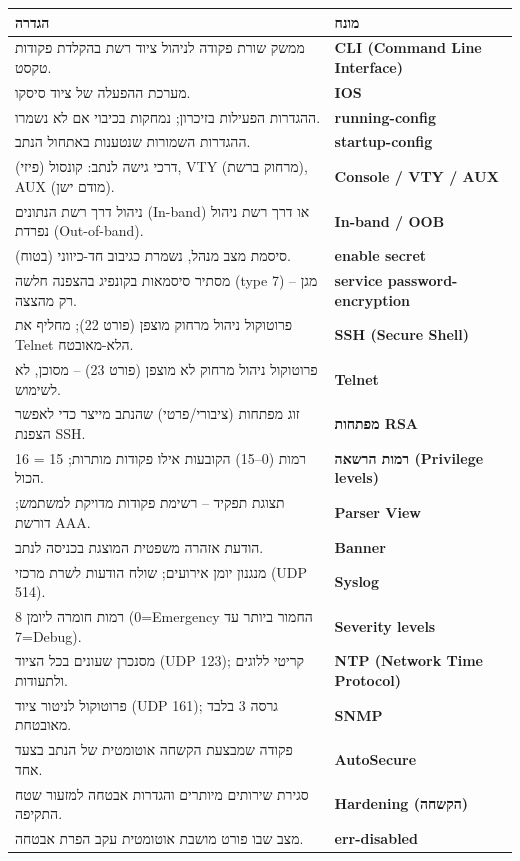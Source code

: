 \documentclass[11pt]{article}
\newcommand{\enLR}[1]{\textenglish{#1}}
\begin{document}
\begin{xltabular}{\linewidth}{|>{\setRTL\raggedleft\arraybackslash}X|>{\setRTL\raggedleft\arraybackslash}X|}
\hline
{}\textbf{הגדרה} & \textbf{מונח} \\
\hline
\endhead
ממשק שורת פקודה לניהול ציוד רשת בהקלדת פקודות טקסט. & \textbf{\enLR{CLI (Command Line Interface)}} \\
\hline
מערכת ההפעלה של ציוד סיסקו. & \textbf{\enLR{IOS}} \\
\hline
ההגדרות הפעילות בזיכרון; נמחקות בכיבוי אם לא נשמרו. & \textbf{\enLR{running-config}} \\
\hline
ההגדרות השמורות שנטענות באתחול הנתב. & \textbf{\enLR{startup-config}} \\
\hline
דרכי גישה לנתב: קונסול (פיזי), \enLR{VTY} (מרחוק ברשת), \enLR{AUX} (מודם ישן). & \textbf{\enLR{Console / VTY / AUX}} \\
\hline
ניהול דרך רשת הנתונים \enLR{(In-band)} או דרך רשת ניהול נפרדת \enLR{(Out-of-band).} & \textbf{\enLR{In-band / OOB}} \\
\hline
סיסמת מצב מנהל, נשמרת כגיבוב חד-כיווני (בטוח). & \textbf{\enLR{enable secret}} \\
\hline
מסתיר סיסמאות בקונפיג בהצפנה חלשה \enLR{(type 7)} – מגן רק מהצצה. & \textbf{\enLR{service password-encryption}} \\
\hline
פרוטוקול ניהול מרחוק מוצפן (פורט \enLR{22)}; מחליף את \enLR{Telnet} הלא-מאובטח. & \textbf{\enLR{SSH (Secure Shell)}} \\
\hline
פרוטוקול ניהול מרחוק לא מוצפן (פורט \enLR{23)} – מסוכן, לא לשימוש. & \textbf{\enLR{Telnet}} \\
\hline
זוג מפתחות (ציבורי/פרטי) שהנתב מייצר כדי לאפשר הצפנת \enLR{SSH.} & \textbf{מפתחות \enLR{RSA}} \\
\hline
\enLR{16} רמות \enLR{(0}–\enLR{15)} הקובעות אילו פקודות מותרות; \enLR{15} = הכול. & \textbf{רמות הרשאה \enLR{(Privilege levels)}} \\
\hline
תצוגת תפקיד – רשימת פקודות מדויקת למשתמש; דורשת \enLR{AAA.} & \textbf{\enLR{Parser View}} \\
\hline
הודעת אזהרה משפטית המוצגת בכניסה לנתב. & \textbf{\enLR{Banner}} \\
\hline
מנגנון יומן אירועים; שולח הודעות לשרת מרכזי \enLR{(UDP 514).} & \textbf{\enLR{Syslog}} \\
\hline
\enLR{8} רמות חומרה ליומן \enLR{(0=Emergency} החמור ביותר עד \enLR{7=Debug).} & \textbf{\enLR{Severity levels}} \\
\hline
מסנכרן שעונים בכל הציוד \enLR{(UDP 123)}; קריטי ללוגים ולתעודות. & \textbf{\enLR{NTP (Network Time Protocol)}} \\
\hline
פרוטוקול לניטור ציוד \enLR{(UDP 161)}; גרסה \enLR{3} בלבד מאובטחת. & \textbf{\enLR{SNMP}} \\
\hline
פקודה שמבצעת הקשחה אוטומטית של הנתב בצעד אחד. & \textbf{\enLR{AutoSecure}} \\
\hline
סגירת שירותים מיותרים והגדרות אבטחה למזעור שטח התקיפה. & \textbf{\enLR{Hardening} (הקשחה)} \\
\hline
מצב שבו פורט מושבת אוטומטית עקב הפרת אבטחה. & \textbf{\enLR{err-disabled}} \\
\hline
\end{xltabular}
\end{document}
